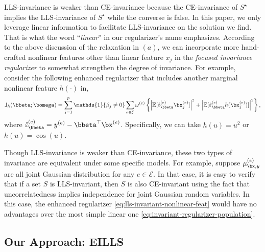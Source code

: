 \documentclass[10pt]{article}
\numberwithin{equation}{section}
\begin{document}
{LLS-invariance is weaker than CE-invariance because the CE-invariance of $S^\star$ implies the LLS-invariance of $S^\star$ while the converse is false.  In this paper, we only leverage linear information to facilitate LLS-invariance on the solution we find. That is what the word ``\emph{linear}'' in our regularizer's name emphasizes. According to the above discussion of the relaxation in $(a)$, we can incorporate more hand-crafted nonlinear features other than linear feature $x_j$ in the \emph{focused invariance regularizer} to somewhat strengthen the degree of invariance. For example, consider the following enhanced regularizer that includes another marginal nonlinear feature $h(\cdot)$ in,
\begin{align}
\label{eq:lls-invariant-nonlinear-feat}
    \mathsf{J}_{h}(\bbeta;\bomega) = \sum_{j=1}^p \mathds{1}\{\beta_j \neq 0\} \sum_{e\in \mathcal{E}} \omega^{(e)} \left\{ \left| \mathbb{E}[ \hat{\varepsilon}^{(e)}_{\bbeta} \bx_j^{(e)}] \right|^2 + \left| \mathbb{E}[ \hat{\varepsilon}^{(e)}_{\bbeta} h(\bx_j^{(e)}) ] \right|^2\right\},
\end{align} where $\hat{\varepsilon}^{(e)}_{\bbeta} = y^{(e)} - \bbeta^\top \bx^{(e)}$. Specifically, we can take $h(u) = u^2$ or $h(u) = \cos(u)$.

Though LLS-invariance is weaker than CE-invariance, these two types of invariance are equivalent under some specific models. For example, suppose $\mu^{(e)}_{\bx, y}$ are all joint Gaussian distribution for any $e\in \mathcal{E}$. In that case, it is easy to verify that if a set $S$ is LLS-invariant, then $S$ is also CE-invariant using the fact that uncorrelatedness implies independence for joint Gaussian random variables. In this case, the enhanced regularizer \eqref{eq:lls-invariant-nonlinear-feat} would have no advantages over the most simple linear one \eqref{eq:invariant-regularizer-population}.


\subsection{Our Approach: EILLS}

}
\end{document}
